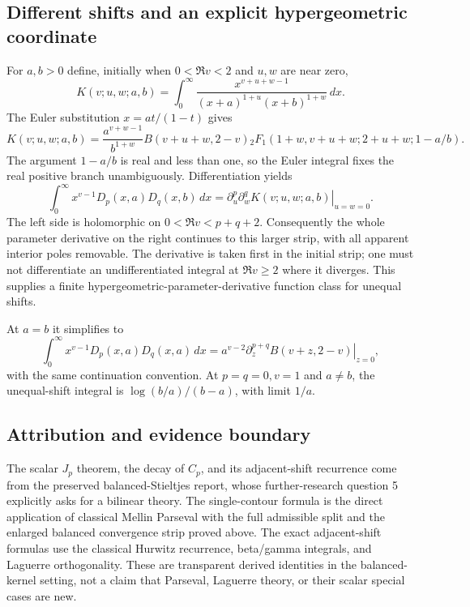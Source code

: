 \subsection{Different shifts and an explicit hypergeometric coordinate}

For $a,b>0$ define, initially when $0<\Re v<2$ and $u,w$ are near zero,
\[
 K(v;u,w;a,b)=\int_0^\infty
       \frac{x^{v+u+w-1}}{(x+a)^{1+u}(x+b)^{1+w}}\,dx.
\]
The Euler substitution $x=at/(1-t)$ gives
\begin{equation}\label{stbil:hypergeometric}
 K(v;u,w;a,b)=
 \frac{a^{v+w-1}}{b^{1+w}}B(v+u+w,2-v)
 {}_2F_1(1+w,v+u+w;2+u+w;1-a/b).
\end{equation}
The argument $1-a/b$ is real and less than one, so the Euler integral
fixes the real positive branch unambiguously.  Differentiation yields
\[
 \int_0^\infty x^{v-1}D_p(x,a)D_q(x,b)\,dx
       =\left.\partial_u^p\partial_w^qK(v;u,w;a,b)\right|_{u=w=0}.
\]
The left side is holomorphic on $0<\Re v<p+q+2$.  Consequently the whole
parameter derivative on the right continues to this larger strip, with
all apparent interior poles removable.  The derivative is taken first
in the initial strip; one must not differentiate an undifferentiated
integral at $\Re v\geq2$ where it diverges.  This supplies a finite
hypergeometric-parameter-derivative function class for unequal shifts.

At $a=b$ it simplifies to
\[
 \int_0^\infty x^{v-1}D_p(x,a)D_q(x,a)\,dx
   =a^{v-2}\left.\partial_z^{p+q}B(v+z,2-v)\right|_{z=0},
\]
with the same continuation convention.  At $p=q=0,v=1$ and $a\ne b$,
the unequal-shift integral is $\log(b/a)/(b-a)$, with limit $1/a$.

\subsection{Attribution and evidence boundary}

The scalar $J_p$ theorem, the decay of $C_p$, and its adjacent-shift
recurrence come from the preserved
balanced-Stieltjes report, whose further-research question 5 explicitly
asks for a bilinear theory.  The single-contour formula is the direct
application of classical Mellin Parseval with the full admissible split
and the enlarged balanced convergence strip proved above.  The exact
adjacent-shift formulas use the classical Hurwitz recurrence, beta/gamma
integrals, and Laguerre orthogonality.  These are transparent derived
identities in the balanced-kernel setting, not a claim that Parseval,
Laguerre theory, or their scalar special cases are new.

